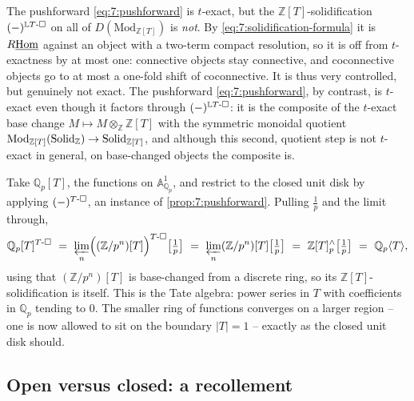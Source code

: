 \begin{remark}
\label{rmk:7:not-t-exact}
The pushforward \eqref{eq:7:pushforward} is $t$-exact, but the
$\mathbb{Z}[T]$-solidification $(-)^{\mathbb{L}T\text{-}\square}$ on all of
$D(\mathrm{Mod}_{\mathbb{Z}[T]})$ is \emph{not}. By
\eqref{eq:7:solidification-formula} it is $R\underline{\operatorname{Hom}}$ against an object with a
two-term compact resolution, so it is off from $t$-exactness by at most one:
connective objects stay connective, and coconnective objects go to at most a
one-fold shift of coconnective. It is thus very controlled, but genuinely not
exact. The pushforward \eqref{eq:7:pushforward}, by contrast, is $t$-exact even
though it factors through $(-)^{\mathbb{L}T\text{-}\square}$: it is the composite of the
$t$-exact base change $M\mapsto M\otimes_{\mathbb{Z}}\mathbb{Z}[T]$ with the
symmetric monoidal quotient
$\mathrm{Mod}_{\mathbb{Z}[T]}(\mathrm{Solid}_{\mathbb{Z}})\to\mathrm{Solid}_{\mathbb{Z}[T]}$,
and although this second, quotient step is not $t$-exact in general, on
base-changed objects the composite is.
\end{remark}

\begin{example}
\label{ex:7:closed-disk-Qp}
Take $\mathbb{Q}_p[T]$, the functions on $\mathbb{A}^1_{\mathbb{Q}_p}$, and
restrict to the closed unit disk by applying $(-)^{T\text{-}\square}$, an instance of
\cref{prop:7:pushforward}. Pulling $\tfrac1p$ and the limit through,
\begin{equation*}
\mathbb{Q}_p[T]^{\Tsolid}\ =\ \varprojlim_{n}\Bigl((\mathbb{Z}/p^n)[T]
\Bigr)^{\Tsolid}\bigl[\tfrac1p\bigr]\ =\ \varprojlim_{n}(\mathbb{Z}/p^n)[T]
\bigl[\tfrac1p\bigr]\ =\ \mathbb{Z}[T]^{\wedge}_{p}\bigl[\tfrac1p\bigr]
\ =\ \mathbb{Q}_p\langle T\rangle,
\end{equation*}
using that $(\mathbb{Z}/p^n)[T]$ is base-changed from a discrete ring, so its
$\mathbb{Z}[T]$-solidification is itself. This is the Tate algebra: power series
in $T$ with coefficients in $\mathbb{Q}_p$ tending to $0$. The smaller ring of
functions converges on a larger region -- one is now allowed to sit on the
boundary $|T|=1$ -- exactly as the closed unit disk should.
\end{example}

\subsection{Open versus closed: a recollement}

